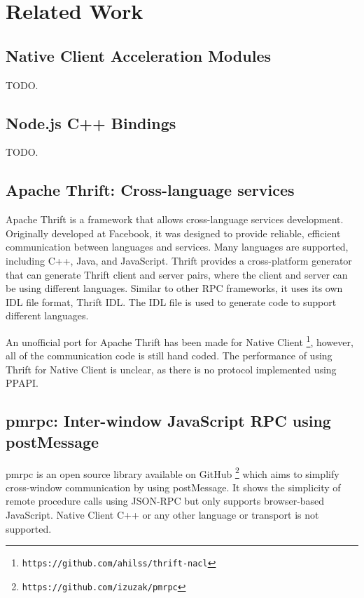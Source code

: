 \chapter{Related Work} 
\label{Chapter3} 

\section{Native Client Acceleration Modules} %
\label{sec:naclam}
TODO.

\section{Node.js C++ Bindings} %
\label{sec:node_js_c_bindings}
TODO.



\section{Apache Thrift: Cross-language services} %
\label{sec:apache_thrift_cross_language_services}
Apache Thrift is a framework that allows cross-language services development. Originally developed at Facebook, it was designed to provide reliable, efficient communication between languages and services. Many languages are supported, including C++, Java, and JavaScript. Thrift provides a cross-platform generator that can generate Thrift client and server pairs, where the client and server can be using different languages. Similar to other RPC frameworks, it uses its own IDL file format, Thrift IDL. The IDL file is used to generate code to support different languages.

An unofficial port for Apache Thrift has been made for Native Client \footnote{\lstinline+https://github.com/ahilss/thrift-nacl+}, however, all of the communication code is still hand coded. The performance of using Thrift for Native Client is unclear, as there is no protocol implemented using PPAPI.


\section{pmrpc: Inter-window JavaScript RPC using postMessage} %
\label{sec:pmrpc_json_rpc_using_postmessage}
pmrpc is an open source library available on GitHub \footnote{\lstinline+https://github.com/izuzak/pmrpc+} which aims to simplify cross-window communication by using postMessage. It shows the simplicity of remote procedure calls using JSON-RPC but only supports browser-based JavaScript. Native Client C++ or any other language or transport is not supported.

